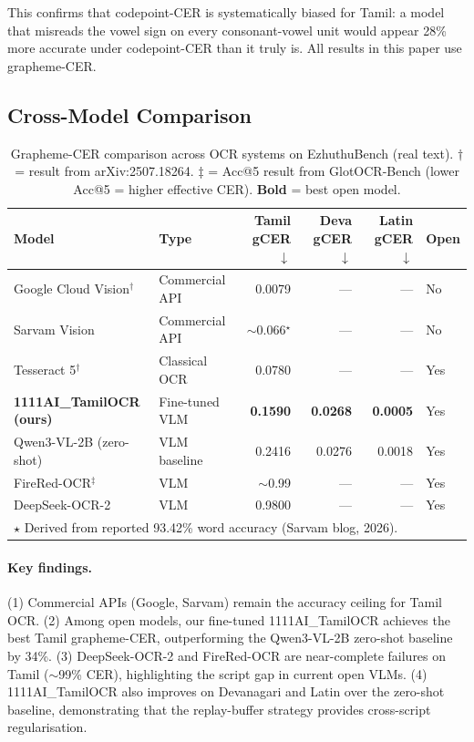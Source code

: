 \documentclass[11pt,a4paper]{article}
\begin{document}
This confirms that codepoint-CER is systematically biased for Tamil:
a model that misreads the vowel sign on every consonant-vowel unit would
appear 28\% more accurate under codepoint-CER than it truly is.
All results in this paper use grapheme-CER.

\subsection{Cross-Model Comparison}

\begin{table}[h]
\centering
\caption{Grapheme-CER comparison across OCR systems on EzhuthuBench (real text).
$\dagger$ = result from arXiv:2507.18264. $\ddagger$ = Acc@5 result from
GlotOCR-Bench \citep{glotocr2026} (lower Acc@5 = higher effective CER).
\textbf{Bold} = best open model.}
\label{tab:crossmodel}
\begin{tabular}{llrrrl}
\toprule
Model & Type & Tamil gCER $\downarrow$ & Deva gCER $\downarrow$ & Latin gCER $\downarrow$ & Open \\
\midrule
Google Cloud Vision$^\dagger$  & Commercial API  & 0.0079 & ---    & ---    & No \\
Sarvam Vision                  & Commercial API  & $\sim$0.066$^\star$ & ---    & ---    & No \\
Tesseract 5$^\dagger$          & Classical OCR   & 0.0780 & ---    & ---    & Yes \\
\midrule
\textbf{1111AI\_TamilOCR (ours)} & Fine-tuned VLM & \textbf{0.1590} & \textbf{0.0268} & \textbf{0.0005} & Yes \\
Qwen3-VL-2B (zero-shot)        & VLM baseline    & 0.2416 & 0.0276 & 0.0018 & Yes \\
FireRed-OCR$^\ddagger$         & VLM             & $\sim$0.99 & --- & --- & Yes \\
DeepSeek-OCR-2                 & VLM             & 0.9800 & ---    & ---    & Yes \\
\bottomrule
\multicolumn{6}{l}{$\star$ Derived from reported 93.42\% word accuracy (Sarvam blog, 2026).}\\
\end{tabular}
\end{table}

\paragraph{Key findings.}
(1) Commercial APIs (Google, Sarvam) remain the accuracy ceiling for Tamil OCR.
(2) Among open models, our fine-tuned 1111AI\_TamilOCR achieves the best
    Tamil grapheme-CER, outperforming the Qwen3-VL-2B zero-shot baseline
    by 34\%.
(3) DeepSeek-OCR-2 and FireRed-OCR are near-complete failures on Tamil
    ($\sim$99\% CER), highlighting the script gap in current open VLMs.
(4) 1111AI\_TamilOCR also improves on Devanagari and Latin over the zero-shot
    baseline, demonstrating that the replay-buffer strategy provides
    cross-script regularisation.
\end{document}
